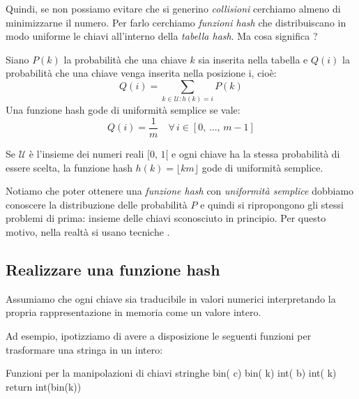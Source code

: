 Quindi, se non possiamo evitare che si generino \emph{collisioni} cerchiamo almeno
di minimizzarne il numero. Per farlo cerchiamo \emph{funzioni hash} che
distribuiscano in modo uniforme le chiavi all'interno della \emph{tabella hash}.
Ma cosa significa ?
\begin{definition}
    Siano $P(k)$ la probabilità che una chiave $k$ sia inserita nella tabella e
    $Q(i)$ la probabilità che una chiave venga inserita nella posizione i, cioè:
    \[Q(i)=\sum_{k\in\mathcal{U}:h(k)=i}P(k)\]
    Una funzione hash gode di uniformità semplice se vale:
    \[Q(i)=\frac{1}{m}\quad\forall\,i\in[0,\,\dots,\,m-1]\]
\end{definition}
\begin{eg}
    Se $\mathcal{U}$ è l'insieme dei numeri reali $[0,\,1[$ e ogni chiave ha la
    stessa probabilità di essere scelta, la funzione hash $h(k)=\lfloor km\rfloor$
    gode di uniformità semplice.
\end{eg}\noindent
Notiamo che poter ottenere una \emph{funzione hash} con \emph{uniformità semplice}
dobbiamo conoscere la distribuzione delle probabilità $P$ e quindi si ripropongono
gli stessi problemi di prima: insieme delle chiavi sconosciuto in principio.
Per questo motivo, nella realtà si usano tecniche .

\subsection{Realizzare una funzione hash}
Assumiamo che ogni chiave sia traducibile in valori numerici interpretando la
propria rappresentazione in memoria come un valore intero.

Ad esempio, ipotizziamo di avere a disposizione le seguenti funzioni per
trasformare una stringa in un intero:
\begin{code}{Funzioni per la manipolazioni di chiavi stringhe}
 bin( c)
\nl{}
 bin( k)
\nl{}
 int( b)
\nl{}
\rmbreak\ind{} int( k)\\
    return int(bin(k))
\end{code}

